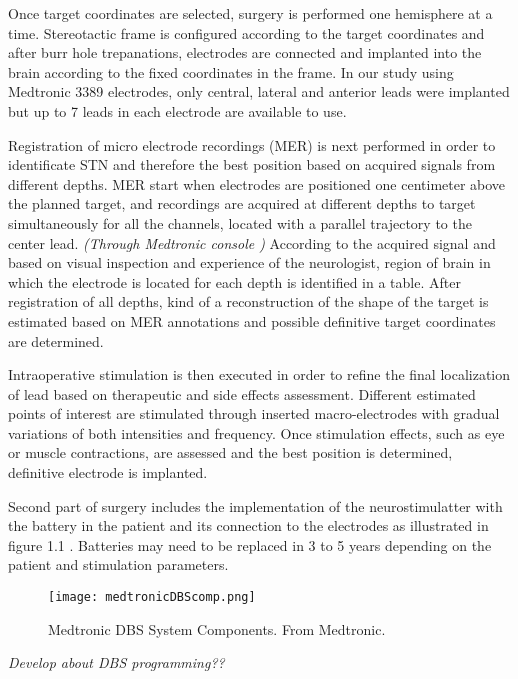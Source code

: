 Once target coordinates are selected, surgery is performed one hemisphere at a time. Stereotactic frame is configured according to the target coordinates and after burr hole trepanations, electrodes are connected and implanted into the brain according to the fixed coordinates in the frame. In our study using Medtronic 3389 electrodes, only central, lateral and anterior leads were implanted but up to 7 leads in each electrode are available to use.

Registration of micro electrode recordings (MER) is next performed in order to identificate STN and therefore the best position based on acquired signals from different depths. MER start when electrodes are positioned one centimeter above the planned target, and recordings are acquired at different depths to target simultaneously for all the channels, located with a parallel trajectory to the center lead. \textit{(Through Medtronic console )}
According to the acquired signal and based on visual inspection and experience of the neurologist, region of brain in which the electrode is located for each depth is identified in a table. After registration of all depths, kind of a reconstruction of the shape of the target is estimated based on MER annotations and possible definitive target coordinates are determined.
 
Intraoperative stimulation is then executed in order to refine the final localization of lead based on therapeutic and side effects assessment. Different estimated points of interest are stimulated through inserted macro-electrodes with gradual variations of both intensities and frequency. Once stimulation effects, such as eye or muscle contractions, are assessed and the best position is determined, definitive electrode is implanted.
 
Second part of surgery includes the implementation of the neurostimulatter with the battery in the patient and its connection to the electrodes as illustrated in figure 1.1 \cite{Medtronic2007}. Batteries may need to be replaced in 3 to 5 years depending on the patient and stimulation parameters. 

\begin{figure}[!htb]
     \centering    
         \texttt{[image: medtronicDBScomp.png]} 

       \caption{Medtronic DBS System Components. \small{From Medtronic.}}
     \label{fig:medtronicDBS}
\end{figure}

\textit{Develop about DBS programming??}

